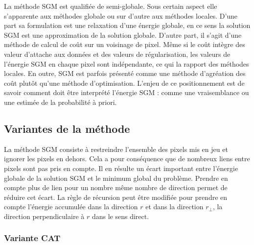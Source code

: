 \documentclass[../main/These_Mathias_Paget.tex]{subfiles}
\begin{document}
La méthode SGM est qualifiée de semi-globale. Sous certain aspect elle s'apparente aux méthodes globale ou sur d'autre aux méthodes locales. D'une part  sa formulation est une relaxation d'une énergie globale, en ce sens la solution SGM est une approximation de la solution globale. D'autre part, il s'agit d'une méthode de calcul de coût sur un voisinage de pixel. Même si le coût intègre des valeur d'attache aux données et des valeurs de régularisation, les valeurs de l’énergie SGM en chaque pixel sont indépendante, ce qui la rapport des méthodes locales. En outre, SGM est parfois présenté comme une méthode d'agréation des coût plutôt qu'une méthode d'optimisation. L'enjeu de ce positionnement est de savoir comment doit être interprété l’énergie SGM : comme une vraisemblance ou une estimée de la probabilité à priori.

\subsection{Variantes de la méthode}
\label{ss:SGM_variantes}

La méthode SGM consiste à restreindre l'ensemble des pixels mis en jeu et ignorer les pixels en dehors. Cela a pour conséquence que de nombreux liens entre pixels sont pas pris en compte. Il en résulte un écart important entre l’énergie globale de la solution SGM et le minimum global du problème. Prendre en compte plus de lien pour un nombre même nombre de direction permet de réduire cet écart. La règle de récursion peut être modifiée pour prendre en compte l'énergie accumulée dans la direction $r$ et dans la direction $r_{\perp}$, la direction perpendiculaire à $r$ dans le sens direct.

\subsubsection{Variante CAT}
\end{document}
